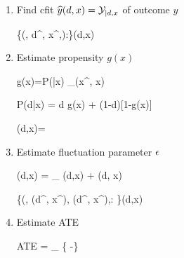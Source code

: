 \begin{enumerate}
\item Find cfit ${\widehat{y}}(d,x)={\cal Y}_{|d,x}$ of outcome $y$

\beq
\{(\s, d^\s, x^\s,):\s\in \Sigma\}\mlarr \haty(d,x)
\eeq

\item Estimate propensity $g(x)$

\beq
g(x)=P(|x)\approx
{}
{\sum_\s \delta(x^\s, x)}
\eeq

\beq
P(d|x) = d g(x) + (1-d)[1-g(x)]
\eeq

\beq
\beta(d,x)=
\eeq

\item Estimate fluctuation parameter $\epsilon$

\beq
\eta(d,x) =
\underbrace{\logit[\haty(d, x)]}_
{\lam(d,x)}
 + \eps \beta(d, x)
\eeq

\beq
\{(\s, \lam(d^\s, x^\s),
\beta(d^\s, x^\s),:
\s\in \Sigma\}\mlarr \HAT{\eta}(d,x)
\eeq

\item Estimate ATE

\beq
ATE =  \sum_\s
\left\{
 \expit[ \HAT{\eta}(d=1,x^\s)]
 -\expit[ \HAT{\eta}(d=0,x^\s)]
 \right\}
\eeq

\end{enumerate}
